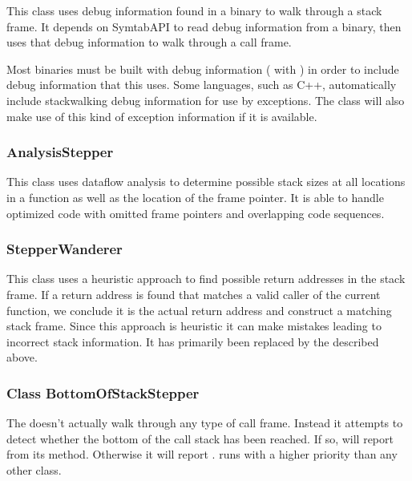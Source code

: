 This class uses debug information found in a binary to walk through a stack
frame. It depends on SymtabAPI to read debug information from a binary, then
uses that debug information to walk through a call frame. 

Most binaries must be built with debug information ( with ) in order to
include debug information that this  uses. Some languages, such as
C++, automatically include stackwalking debug information for use by exceptions.
The  class will also make use of this kind of exception
information if it is available.

\subsubsection{AnalysisStepper}

This class uses dataflow analysis to determine possible stack sizes at
all locations in a function as well as the location of the frame
pointer. It is able to handle optimized code with omitted frame
pointers and overlapping code sequences. 

\subsubsection{StepperWanderer}

This class uses a heuristic approach to find possible return addresses
in the stack frame. If a return address is found that matches a valid
caller of the current function, we conclude it is the actual return
address and construct a matching stack frame. Since this approach is
heuristic it can make mistakes leading to incorrect stack
information. It has primarily been replaced by the
 described above. 

\subsubsection{Class BottomOfStackStepper}

The  doesn't actually walk through any type of call frame.
Instead it attempts to detect whether the bottom of the call stack has been
reached. If so,  will report  from its
 method. Otherwise it will report .
runs with a higher priority than any other  class.

